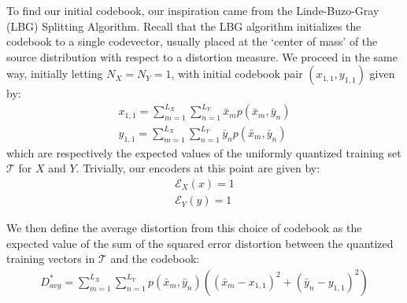 To find our initial codebook, our inspiration came from the Linde-Buzo-Gray (LBG) Splitting Algorithm. Recall that the LBG algorithm initializes the codebook to a single codevector, usually placed at the `center of mass' of the source distribution with respect to a distortion measure. We proceed in the same way, initially letting $N_X=N_Y=1$, with initial codebook pair $(x_{1,1},y_{1,1})$ given by:
\begin{align}
    x_{1,1} = \sum_{m=1}^{L_X}\sum_{n=1}^{L_Y}\bar x_m p(\bar x_m, \bar y_n)\\
    y_{1,1} = \sum_{m=1}^{L_X}\sum_{n=1}^{L_Y}\bar y_n p(\bar x_m, \bar y_n)
\end{align}
which are respectively the expected values of the uniformly quantized training set $\mathcal T$ for $X$ and $Y$. Trivially, our encoders at this point are given by:
\begin{align}
    \mathcal E_X(x) = 1\\
    \mathcal E_Y(y) = 1
\end{align}

We then define the average distortion from this choice of codebook as the expected value of the sum of the squared error distortion between the quantized training vectors in $\mathcal T$ and the codebook:
\begin{align}
    D^*_{avg}=\sum_{m=1}^{L_X}\sum_{n=1}^{L_Y}p(\bar x_m,\bar y_n)\left((\bar x_m-x_{1,1})^2+(\bar y_n-y_{1,1})^2\right)\\
\end{align}

